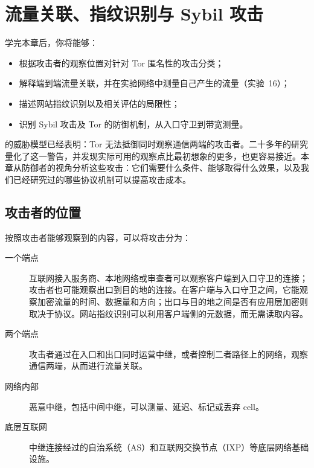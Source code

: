 \chapter{流量关联、指纹识别与 Sybil 攻击}\label{cap:26-attacchi}

\begin{obiettivi}
学完本章后，你将能够：
\begin{itemize}[nosep]
  \item 根据攻击者的观察位置对针对 Tor 匿名性的攻击分类；
  \item 解释端到端流量关联，并在实验网络中测量自己产生的流量（实验~16）；
  \item 描述网站指纹识别以及相关评估的局限性；
  \item 识别 Sybil 攻击及 Tor 的防御机制，从入口守卫到带宽测量。
\end{itemize}
\end{obiettivi}

 的威胁模型已经表明：Tor 无法抵御同时观察通信两端的攻击者。二十多年的研究量化了这一警告，并发现实际可用的观察点比最初想象的更多，也更容易接近。本章从防御者的视角分析这些攻击：它们需要什么条件、能够取得什么效果，以及我们已经研究过的哪些协议机制可以提高攻击成本。

\section{攻击者的位置}\label{sec:att-posizioni}

按照攻击者能够观察到的内容，可以将攻击分为：
\begin{description}
  \item[一个端点] 互联网接入服务商、本地网络或审查者可以观察客户端到入口守卫的连接；攻击者也可能观察出口到目的地的连接。在客户端与入口守卫之间，它能观察加密流量的时间、数据量和方向；出口与目的地之间是否有应用层加密则取决于协议。网站指纹识别可以利用客户端侧的元数据，而无需读取内容。
  \item[两个端点] 攻击者通过在入口和出口同时运营中继，或者控制二者路径上的网络，观察通信两端，从而进行流量关联。
  \item[网络内部] 恶意中继，包括中间中继，可以测量、延迟、标记或丢弃 cell。
  \item[底层互联网] 中继连接经过的自治系统（AS）和互联网交换节点（IXP）等底层网络基础设施。
\end{description}

